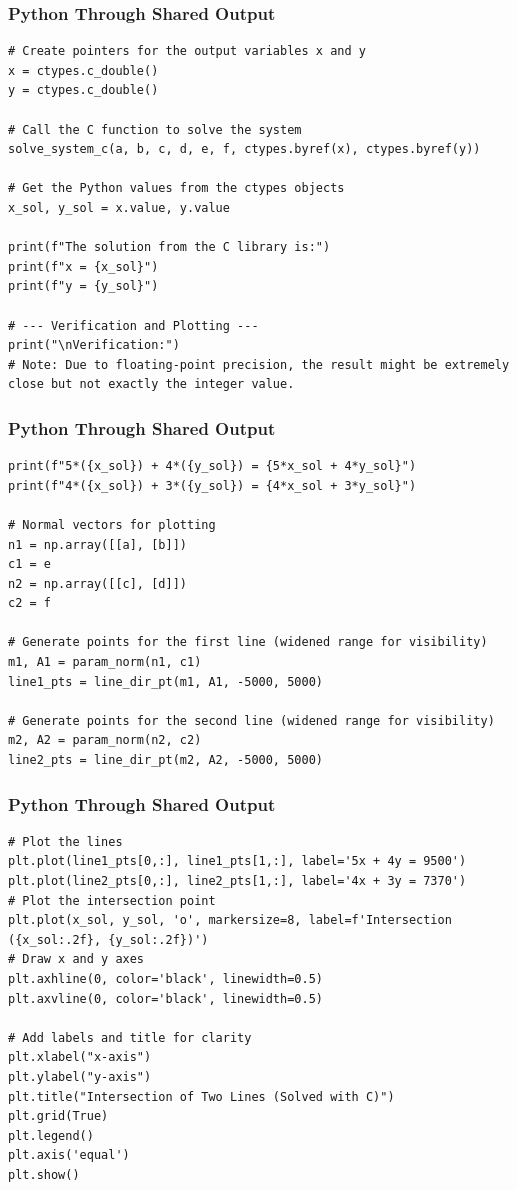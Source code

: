 \documentclass{beamer}
\begin{document}
\begin{frame}[fragile]
\frametitle{Python Through Shared Output}
\begin{lstlisting}
# Create pointers for the output variables x and y
x = ctypes.c_double()
y = ctypes.c_double()

# Call the C function to solve the system
solve_system_c(a, b, c, d, e, f, ctypes.byref(x), ctypes.byref(y))

# Get the Python values from the ctypes objects
x_sol, y_sol = x.value, y.value

print(f"The solution from the C library is:")
print(f"x = {x_sol}")
print(f"y = {y_sol}")

# --- Verification and Plotting ---
print("\nVerification:")
# Note: Due to floating-point precision, the result might be extremely close but not exactly the integer value.
\end{lstlisting}
\end{frame}
\begin{frame}[fragile]
\frametitle{Python Through Shared Output}
\begin{lstlisting}
print(f"5*({x_sol}) + 4*({y_sol}) = {5*x_sol + 4*y_sol}")
print(f"4*({x_sol}) + 3*({y_sol}) = {4*x_sol + 3*y_sol}")

# Normal vectors for plotting
n1 = np.array([[a], [b]])
c1 = e
n2 = np.array([[c], [d]])
c2 = f

# Generate points for the first line (widened range for visibility)
m1, A1 = param_norm(n1, c1)
line1_pts = line_dir_pt(m1, A1, -5000, 5000)

# Generate points for the second line (widened range for visibility)
m2, A2 = param_norm(n2, c2)
line2_pts = line_dir_pt(m2, A2, -5000, 5000)
\end{lstlisting}
\end{frame}
\begin{frame}[fragile]
\frametitle{Python Through Shared Output}
\begin{lstlisting}
# Plot the lines
plt.plot(line1_pts[0,:], line1_pts[1,:], label='5x + 4y = 9500')
plt.plot(line2_pts[0,:], line2_pts[1,:], label='4x + 3y = 7370')
# Plot the intersection point
plt.plot(x_sol, y_sol, 'o', markersize=8, label=f'Intersection ({x_sol:.2f}, {y_sol:.2f})')
# Draw x and y axes
plt.axhline(0, color='black', linewidth=0.5)
plt.axvline(0, color='black', linewidth=0.5)

# Add labels and title for clarity
plt.xlabel("x-axis")
plt.ylabel("y-axis")
plt.title("Intersection of Two Lines (Solved with C)")
plt.grid(True)
plt.legend()
plt.axis('equal')
plt.show()
\end{lstlisting}
\end{frame}
\end{document}
